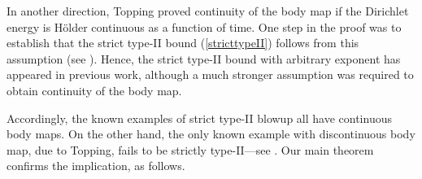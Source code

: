 \documentclass[12pt]{amsart}
\theoremstyle{others}
\numberwithin{equation}{section}
\begin{document}
In another direction, Topping \cite{toppingholder} proved continuity of the body map if the Dirichlet energy is H\"older continuous as a function of time. One step in the proof was to establish that the strict type-II bound (\ref{stricttypeII}) follows from this assumption (see \cite[Lemma 2.2]{toppingholder}). Hence, the strict type-II bound with arbitrary exponent has appeared in previous work, although a much stronger assumption was required to obtain continuity of the body map.


Accordingly, the known examples of strict type-II blowup all have continuous body maps. On the other hand, the only known example with discontinuous body map, due to Topping, fails to be strictly type-II---see \cite[Theorem 1.14e]{toppingwindingbehavior}. Our main theorem confirms the implication, as follows. %

\end{document}
